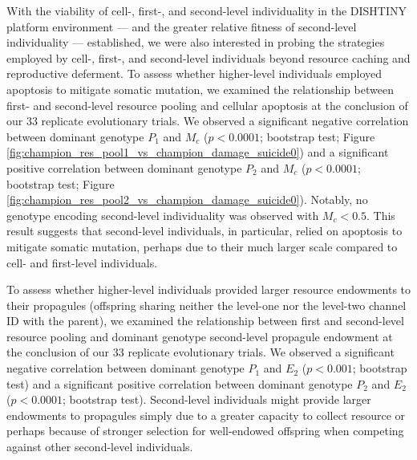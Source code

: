 With the viability of cell-, first-, and second-level individuality in the DISHTINY platform environment --- and the greater relative fitness of second-level individuality --- established, we were also interested in probing the strategies employed by cell-, first-, and second-level individuals beyond resource caching and reproductive deferment.
To assess whether higher-level individuals employed apoptosis to mitigate somatic mutation, we examined the relationship between first- and second-level resource pooling and cellular apoptosis at the conclusion of our 33 replicate evolutionary trials.
We observed a significant negative correlation between dominant genotype $P_1$ and $M_{c}$ ($p < 0.0001$; bootstrap test; Figure \ref{fig:champion_res_pool1_vs_champion_damage_suicide0}) and a significant positive correlation between dominant genotype $P_2$ and $M_{c}$ ($p < 0.0001$; bootstrap test; Figure \ref{fig:champion_res_pool2_vs_champion_damage_suicide0}).
Notably, no genotype encoding second-level individuality was observed with $M_{c} < 0.5$.
This result suggests that second-level individuals, in particular, relied on apoptosis to mitigate somatic mutation, perhaps due to their much larger scale compared to cell- and first-level individuals.

To assess whether higher-level individuals provided larger resource endowments to their propagules (offspring sharing neither the level-one nor the level-two channel ID with the parent), we examined the relationship between first and second-level resource pooling and dominant genotype second-level propagule endowment at the conclusion of our 33 replicate evolutionary trials.
We observed a significant negative correlation between dominant genotype $P_1$ and $E_2$ ($p < 0.001$; bootstrap test) and a significant positive correlation between dominant genotype $P_2$ and $E_2$ ($p <  0.0001$; bootstrap test).
Second-level individuals might provide larger endowments to propagules simply due to a greater capacity to collect resource or perhaps because of stronger selection for well-endowed offspring when competing against other second-level individuals.
